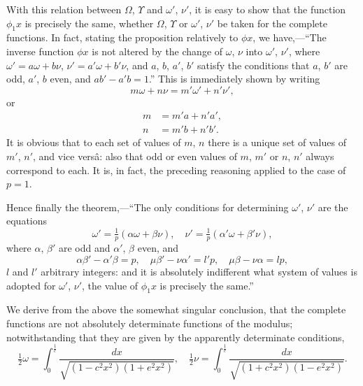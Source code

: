 \documentclass[12pt,a4paper]{article}
\begin{document}
With this relation between $\Omega$, $\Upsilon$ and $\omega'$, $\nu'$, it is easy to show that the function $\phi_1 x$ is precisely the same, whether $\Omega$, $\Upsilon$ or $\omega'$, $\nu'$ be taken for the complete functions. In fact, stating the proposition relatively to $\phi x$, we have,---``The inverse function $\phi x$ is not altered by the change of $\omega$, $\nu$ into $\omega'$, $\nu'$, where $\omega' = a\omega + b\nu$, $\nu' = a'\omega + b'\nu$, and $a$, $b$, $a'$, $b'$ satisfy the conditions that $a$, $b'$ are odd, $a'$, $b$ even, and $ab' - a'b = 1$.'' This is immediately shown by writing
\[
m\omega + n\nu = m'\omega' + n'\nu',
\]
or
\begin{align*}
m &= m'a + n'a',\\
n &= m'b + n'b'.
\end{align*}
It is obvious that to each set of values of $m$, $n$ there is a unique set of values of $m'$, $n'$, and vice vers\^a: also that odd or even values of $m$, $m'$ or $n$, $n'$ always correspond to each. It is, in fact, the preceding reasoning applied to the case of $p = 1$.

Hence finally the theorem,---``The only conditions for determining $\omega'$, $\nu'$ are the equations
\[
\omega' = \tfrac{1}{p}(\alpha\omega + \beta\nu),\quad \nu' = \tfrac{1}{p}(\alpha'\omega + \beta'\nu),
\]
where $\alpha$, $\beta'$ are odd and $\alpha'$, $\beta$ even, and
\[
\alpha\beta' - \alpha'\beta = p,\quad \mu\beta' - \nu\alpha' = l'p,\quad \mu\beta - \nu\alpha = lp,
\]
$l$ and $l'$ arbitrary integers: and it is absolutely indifferent what system of values is adopted for $\omega'$, $\nu'$, the value of $\phi_1 x$ is precisely the same.''

\newpage
\setcounter{page}{135}

We derive from the above the somewhat singular conclusion, that the complete functions are not absolutely determinate functions of the modulus; notwithstanding that they are given by the apparently determinate conditions,
\[
\tfrac{1}{2}\omega = \int_0^{\frac{1}{c}} \frac{dx}{\sqrt{(1 - c^2 x^2)(1 + e^2 x^2)}},\quad
\tfrac{1}{2}\nu = \int_0^{\frac{1}{e}} \frac{dx}{\sqrt{(1 + c^2 x^2)(1 - e^2 x^2)}}.
\]
\end{document}
